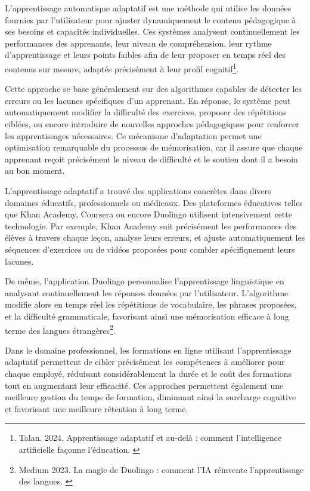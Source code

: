 \documentclass[11pt,a4paper]{report}
\begin{document}
L’apprentissage automatique adaptatif est une méthode qui utilise les données fournies par l’utilisateur pour ajuster dynamiquement le contenu pédagogique à ses besoins et capacités individuelles. Ces systèmes analysent continuellement les performances des apprenants, leur niveau de compréhension, leur rythme d'apprentissage et leurs points faibles afin de leur proposer en temps réel des contenus sur mesure, adaptés précisément à leur profil cognitif\footnote{Talan. 2024. Apprentissage adaptatif et au-delà : comment l'intelligence artificielle façonne l'éducation. \cite{talan}}.

Cette approche se base généralement sur des algorithmes capables de détecter les erreurs ou les lacunes spécifiques d’un apprenant. En réponse, le système peut automatiquement modifier la difficulté des exercices, proposer des répétitions ciblées, ou encore introduire de nouvelles approches pédagogiques pour renforcer les apprentissages nécessaires. Ce mécanisme d’adaptation permet une optimisation remarquable du processus de mémorisation, car il assure que chaque apprenant reçoit précisément le niveau de difficulté et le soutien dont il a besoin au bon moment.

L’apprentissage adaptatif a trouvé des applications concrètes dans divers domaines éducatifs, professionnels ou médicaux. Des plateformes éducatives telles que Khan Academy, Coursera ou encore Duolingo utilisent intensivement cette technologie. Par exemple, Khan Academy suit précisément les performances des élèves à travers chaque leçon, analyse leurs erreurs, et ajuste automatiquement les séquences d’exercices ou de vidéos proposées pour combler spécifiquement leurs lacunes.

De même, l'application Duolingo personnalise l’apprentissage linguistique en analysant continuellement les réponses données par l’utilisateur. L’algorithme modifie alors en temps réel les répétitions de vocabulaire, les phrases proposées, et la difficulté grammaticale, favorisant ainsi une mémorisation efficace à long terme des langues étrangères\footnote{Medium 2023. La magie de Duolingo : comment l'IA réinvente l'apprentissage des langues. \cite{duolingo}}.

Dans le domaine professionnel, les formations en ligne utilisant l’apprentissage adaptatif permettent de cibler précisément les compétences à améliorer pour chaque employé, réduisant considérablement la durée et le coût des formations tout en augmentant leur efficacité. Ces approches permettent également une meilleure gestion du temps de formation, diminuant ainsi la surcharge cognitive et favorisant une meilleure rétention à long terme.
\end{document}
